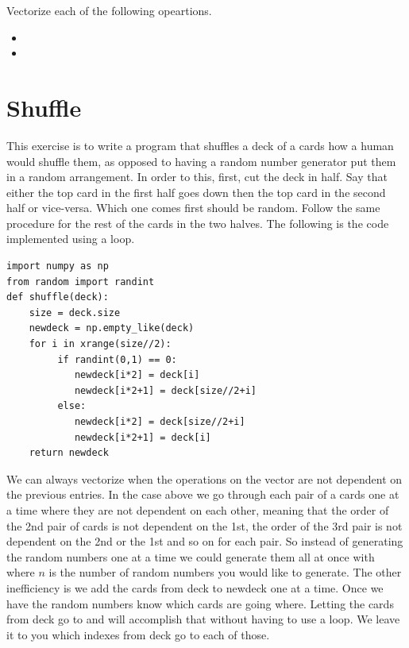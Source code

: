 \begin{problem}
Vectorize each of the following opeartions.
\begin{itemize}[a]

\item 

\item

\end{itemize}
\end{problem}

\section*{Shuffle}
This exercise is to write a program that shuffles a deck of a cards how a human would shuffle them, as opposed to having a random number generator put them in a random arrangement.
In order to this, first, cut the deck in half.
Say that either the top card in the first half goes down then the top card in the second half or vice-versa.
Which one comes first should be random.
Follow the same procedure for the rest of the cards in the two halves.
The following is the code implemented using a loop.
\begin{lstlisting}
import numpy as np
from random import randint
def shuffle(deck):
    size = deck.size
    newdeck = np.empty_like(deck)
    for i in xrange(size//2):
         if randint(0,1) == 0:
            newdeck[i*2] = deck[i]
            newdeck[i*2+1] = deck[size//2+i]
         else:
            newdeck[i*2] = deck[size//2+i]
            newdeck[i*2+1] = deck[i]
    return newdeck
\end{lstlisting}

We can always vectorize when the operations on the vector are not dependent on the previous entries. In the case above we go through each pair of a cards one at a time where they are not dependent on each other, meaning that the order of the 2nd pair of cards is not dependent on the 1st, the order of the 3rd pair is not dependent on the 2nd or the 1st and so on for each pair. So instead of generating the random numbers one at a time we could generate them all at once with  where $n$ is the number of random numbers you would like to generate. The other inefficiency is we add the cards from deck to newdeck one at a time.  Once we have the random numbers know which cards are going where.  Letting the cards from deck go to  and  will accomplish that without having to use a loop. We leave it to you which indexes from deck go to each of those.

